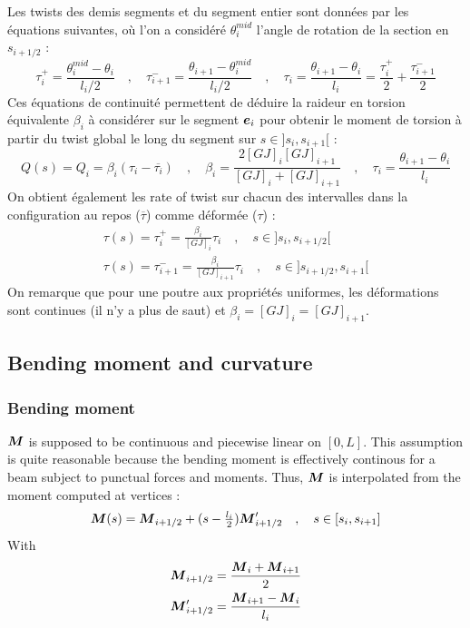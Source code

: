 Les twists des demis segments et du segment entier sont données par les équations suivantes, où l'on a considéré $\theta_i^{mid}$ l'angle de rotation de la section en $s_{i+1/2}$ :
\begin{equation}
	\tau_{i}^{+} = \frac{\theta_i^{mid} - \theta_i}{l_i/2} \quad , \quad
	\tau_{i+1}^{-} = \frac{\theta_{i+1} - \theta_i^{mid}}{l_i/2} \quad , \quad
	\tau_i = \frac{\theta_{i+1}-\theta_{i}}{l_i} = \frac{\tau_{i}^{+}}{2} + \frac{\tau_{i+1}^{-}}{2}
\end{equation}
Ces équations de continuité permettent de déduire la raideur en torsion équivalente $\beta_i$ à considérer sur le segment $\boldsymbol{e}_i$ pour obtenir le moment de torsion à partir du twist global le long du segment sur $s \in ]s_i,s_{i+1}[$ :
 \begin{equation}
	Q(s) = Q_i = \beta_i(\tau_i - \overbar{\tau_i})
	\quad , \quad
	\beta_i = \frac{2 [GJ]_i [GJ]_{i+1}}{[GJ]_i + [GJ]_{i+1}}
	\quad , \quad
	\tau_i = \frac{\theta_{i+1}-\theta_{i}}{l_i}
\end{equation}
On obtient également les rate of twist sur chacun des intervalles dans la configuration au repos ($\overbar{\tau}$) comme déformée ($\tau$) :
\begin{subequations}
	\begin{gather}
		\tau(s) = \tau_{i}^{+} = \frac{\beta_i}{[GJ]_i}\tau_i \quad , \quad s \in ]s_i,s_{i+1/2}[ \\
		\tau(s) = \tau_{i+1}^{-} = \frac{\beta_i}{[GJ]_{i+1}}\tau_i \quad , \quad s \in ]s_{i+1/2},s_{i+1}[
	\end{gather}
\end{subequations}
On remarque que pour une poutre aux propriétés uniformes, les déformations sont continues (il n'y a plus de saut) et $\beta_i = [GJ]_i = [GJ]_{i+1}$.

\subsection{Bending moment and curvature}

\subsubsection{Bending moment}
$\boldsymbol{M}$ is supposed to be continuous and piecewise linear on $[0,L]$. This assumption is quite reasonable because the bending moment is effectively continous for a beam subject to punctual forces and moments. Thus, $\boldsymbol{M}$ is interpolated from the moment computed at vertices :
\begin{equation}
	\boldsymbol{M}(s) = \boldsymbol{M}_{i+1/2} + (s-\tfrac{l_i}{2}) \boldsymbol{M}'_{i+1/2} \quad , \quad s \in [s_i,s_{i+1}]
\end{equation}
With
\begin{subequations}
	\begin{gather}
	\boldsymbol{M}_{i+1/2} = \frac{\boldsymbol{M}_{i} + \boldsymbol{M}_{i+1}}{2} \\
	\boldsymbol{M}'_{i+1/2} = \frac{\boldsymbol{M}_{i+1} - \boldsymbol{M}_{i}}{l_i}
	\end{gather}
\end{subequations}

